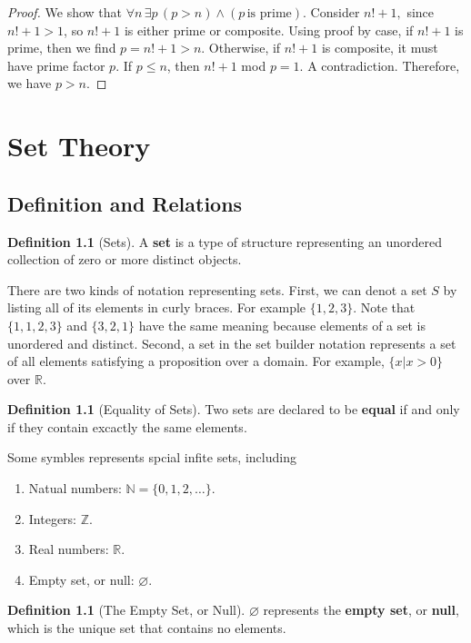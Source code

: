 \documentclass[12pt,a4paper]{report}
\theoremstyle{definition}
\newtheorem{definition}[theorem]{Definition}
\theoremstyle{remark}
\begin{document}
\begin{proof}
    We show that $\forall n \, \exists p \, (p > n) \land (p \, \text{is prime}).$ Consider $n! + 1,$ since $n! + 1 > 1$, so $n! + 1$ is either prime or composite. Using proof by case, if $n! + 1$ is prime, then we find $p = n! +1 > n$. Otherwise, if $n! + 1$ is composite, it must have prime factor $p.$ If $p \leq n$, then $n! + 1$ mod $p = 1$. A contradiction. Therefore, we have $p > n.$ 
\end{proof}

\chapter{Set Theory}

\section{Definition and Relations}

\begin{definition}[Sets]
    A \textbf{set} is a type of structure representing an unordered collection of zero or more distinct objects.
\end{definition}

There are two kinds of notation representing sets. First, we can denot a set $S$ by listing all of its elements in curly braces. For example $\{1, 2, 3\}$. Note that $\{1, 1, 2, 3\}$ and $\{3, 2, 1\}$ have the same meaning because elements of a set is unordered and distinct. Second, a set in the set builder notation represents a set of all elements satisfying a proposition over a domain. For example, $\{x | x > 0\}$ over $\mathbb{R}.$

\begin{definition}[Equality of Sets]
    Two sets are declared to be \textbf{equal} if and only if they contain excactly the same elements.
\end{definition}

Some symbles represents spcial infite sets, including
\begin{enumerate}
    \item Natual numbers: $\mathbb{N} = \{0, 1, 2, \ldots\}.$
    \item Integers: $\mathbb Z.$
    \item Real numbers: $\mathbb R.$
    \item Empty set, or null: $\varnothing.$
\end{enumerate}

\begin{definition}[The Empty Set, or Null]
    $\varnothing$ represents the \textbf{empty set}, or \textbf{null}, which is the unique set that contains no elements.
\end{definition}
\end{document}
